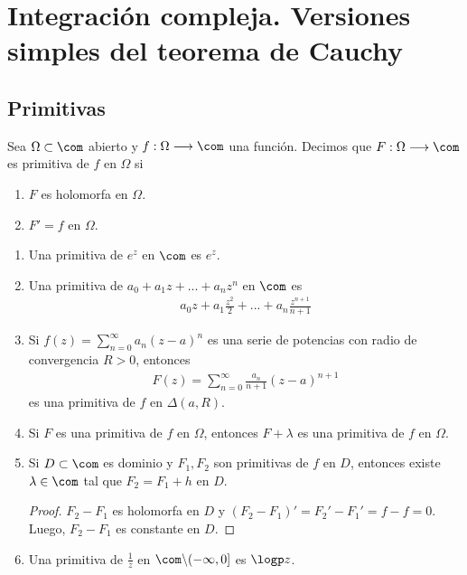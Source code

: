 \chapter{Integración compleja. Versiones simples del teorema de Cauchy}

\section{Primitivas}

\begin{defi}
Sea $\Omega \subset \com$ abierto y $f: \Omega \longrightarrow \com$ una función. Decimos que $F : \Omega \longrightarrow \com$ es primitiva de $f$ en $\Omega$ si
\begin{enumerate}
    \item $F$ es holomorfa en $\Omega$.
    \item $F' = f$ en $\Omega$.
\end{enumerate}
\end{defi}

\begin{ejemplo}
\begin{enumerate}
    \item Una primitiva de $e^z$ en $\com$ es $e^z$.
    \item Una primitiva de $a_0 + a_1z + ... + a_nz^n$ en $\com$ es
    \begin{align*}
        a_0z + a_1\frac{z^2}{2} + ... + a_n \frac{z^{n+1}}{n+1} 
    \end{align*}
    \item Si $f(z) = \sum_{n=0}^{\infty}{a_n(z-a)^n}$ es una serie de potencias con radio de convergencia $R > 0$, entonces
    \begin{align*}
        F(z) =  \sum_{n=0}^{\infty}{\frac{a_n}{n+1}(z-a)^{n+1}}
    \end{align*}
    es una primitiva de $f$ en $\Delta(a,R)$.
    \item Si $F$ es una primitiva de $f$ en $\Omega$, entonces $F + \lambda$ es una primitiva de $f$ en $\Omega$.
    \item Si $D \subset \com$ es dominio y $F_1,F_2$ son primitivas de $f$ en $D$, entonces existe $\lambda \in \com$ tal que $F_2 = F_1 + h$ en $D$.
    \begin{proof}
    $F_2 - F_1$ es holomorfa en $D$ y $(F_2 - F_1)' = F_2' - F_1' = f - f = 0$. Luego, $F_2 - F_1$ es constante en $D$.
     \end{proof}
     \item Una primitiva de $\frac{1}{z}$ en $\com \backslash (-\infty,0]$ es $\logp z$.
\end{enumerate}
\end{ejemplo}

